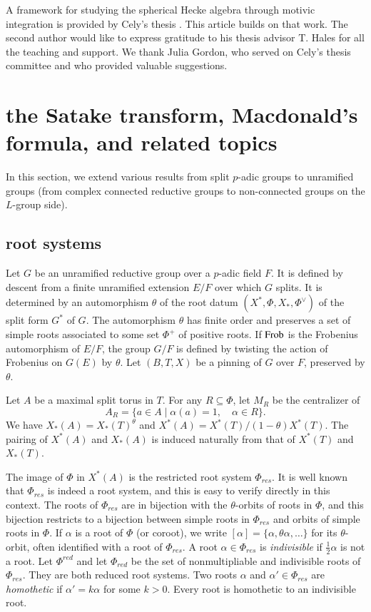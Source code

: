 A framework for studying the spherical Hecke algebra through motivic
integration is provided by Cely's thesis \cite{cely}.  This article
builds on that work.  The second author would like to
express gratitude to his thesis advisor T. Hales for all the
teaching and support.  We thank Julia Gordon, who served on Cely's
thesis committee and who provided valuable suggestions.



\section{the Satake transform, 
Macdonald's formula, and related topics}

In this section, we extend various results from split $p$-adic groups
to unramified groups (from complex connected reductive groups to
non-connected groups on the $L$-group side).

\subsection{root systems}

Let $G$ be an unramified reductive group over a $p$-adic field $F$.
It is defined by descent from a finite unramified extension $E/F$ over
which $G$ splits.  It is determined by an automorphism $\theta$ of the
root datum $(X^*,\Phi,X_*,\Phi^\vee)$ of the split form $G^*$ of $G$.
The automorphism $\theta$ has finite order and preserves a set of
simple roots associated to some set $\Phi^+$ of positive roots.  If
${\operatorname{Frob}}$ is the Frobenius automorphism of $E/F$, the group $G/F$ is
defined by twisting the action of Frobenius on $G(E)$ by $\theta$.  Let
$(B,T,X)$ be a pinning of $G$ over $F$, preserved by $\theta$.

Let $A$ be a maximal split torus in $T$.  For any $R\subseteq \Phi$,
let $M_R$ be the centralizer of
\[
A_R = \{a\in A\mid \alpha(a)=1,\quad \alpha\in R\}.
\]
We have $X_*(A) = X_*(T)^\theta$ and $X^*(A) =
X^*(T)/(1-\theta)X^*(T)$.  The pairing of $X^*(A)$ and $X_*(A)$ is
induced naturally from that of $X^*(T)$ and $X_*(T)$.

The image of $\Phi$ in $X^*(A)$ is the restricted root system $\Phi_{res}$.
It is well known that $\Phi_{res}$ is indeed a root system, and this is
easy to verify directly in this context.  The roots of $\Phi_{res}$ are in
bijection with the $\theta$-orbits of roots in $\Phi$, and this
bijection restricts to a bijection between simple roots in $\Phi_{res}$
and orbits of simple roots in $\Phi$.  If $\alpha$ is a root of $\Phi$
(or coroot), we write $[\alpha]=\{\alpha,\theta\alpha,\ldots\}$ for
its $\theta$-orbit, often identified with a root of $\Phi_{res}$.
A root $\alpha\in\Phi_{res}$ is {\it indivisible} if $\frac12\alpha$ is not a root.
Let $\Phi^{red}$ and 
let $\Phi_{red}$ be the set of nonmultipliable and
indivisible roots of $\Phi_{res}$.  %
They are both reduced root systems.
Two roots $\alpha$ and $\alpha'\in\Phi_{res}$ are {\it homothetic} if
$\alpha' = k\alpha$ for some $k>0$.  Every root is homothetic to an
indivisible root.  %

